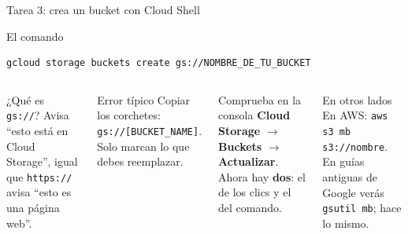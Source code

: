 \documentclass[aspectratio=169,10pt,c]{beamer}
\begin{document}
\begin{frame}[fragile]{Tarea 3: crea un bucket con Cloud Shell}
\begin{block}{El comando}
\begin{lstlisting}
gcloud storage buckets create gs://NOMBRE_DE_TU_BUCKET
\end{lstlisting}
\end{block}
\begin{center}
\end{center}
\begin{columns}[T,onlytextwidth]
\begin{exampleblock}{¿Qué es \texttt{gs://}?}
\small Avisa ``esto está en Cloud Storage'', igual que \texttt{https://} avisa ``esto es una página web''.
\end{exampleblock}
\begin{alertblock}{Error típico}
\small Copiar los corchetes: \texttt{gs://[BUCKET\_NAME]}. Solo marcan lo que debes reemplazar.
\end{alertblock}
\begin{block}{Comprueba en la consola}
\small \textbf{Cloud Storage} $\rightarrow$ \textbf{Buckets} $\rightarrow$ \textbf{Actualizar}. Ahora hay \textbf{dos}: el de los clics y el del comando.
\end{block}
\begin{block}{En otros lados}
\footnotesize En AWS: \texttt{aws s3 mb s3://nombre}. En guías antiguas de Google verás \texttt{gsutil mb}; hace lo mismo.
\end{block}
\end{columns}
\end{frame}
\end{document}
